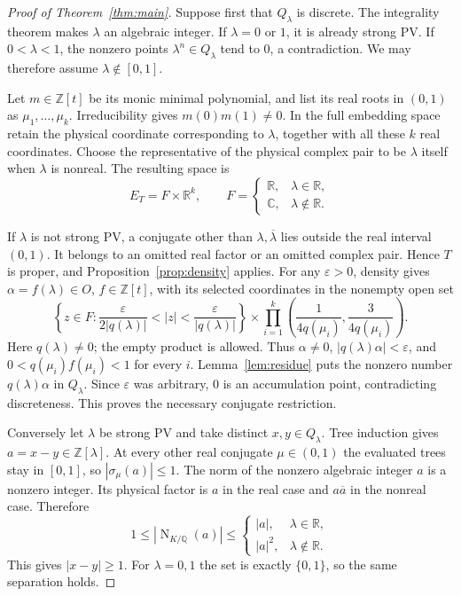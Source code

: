 \documentclass[11pt]{article}
\newcommand{\C}{\mathbb C}
\newcommand{\R}{\mathbb R}
\newcommand{\Z}{\mathbb Z}
\newcommand{\Q}{\mathbb Q}
\DeclareMathOperator{\Norm}{N}
\begin{document}
\begin{proof}[Proof of Theorem~\ref{thm:main}]
Suppose first that $Q_\lambda$ is discrete. The integrality theorem
\cite[Theorem 8.2]{fgh-extended} makes $\lambda$ an algebraic integer.
If $\lambda=0$ or $1$, it is already strong PV. If $0<\lambda<1$,
the nonzero points $\lambda^n\in Q_\lambda$ tend to $0$, a
contradiction. We may therefore assume $\lambda\notin[0,1]$.

Let $m\in\Z[t]$ be its monic minimal polynomial, and list its real
roots in $(0,1)$ as $\mu_1,\ldots,\mu_k$. Irreducibility gives
$m(0)m(1)\ne0$. In the full embedding space retain the physical
coordinate corresponding to $\lambda$, together with all these $k$
real coordinates. Choose the representative of the physical complex pair
to be $\lambda$ itself when $\lambda$ is nonreal. The resulting space is
\[
 E_T=F\times\R^k,\qquad
 F=\begin{cases}\R,&\lambda\in\R,\\\C,&\lambda\notin\R.\end{cases}
\]

If $\lambda$ is not strong PV, a conjugate other than
$\lambda,\overline\lambda$ lies outside the real interval $(0,1)$.
It belongs to an omitted real factor or an omitted complex pair. Hence
$T$ is proper, and Proposition~\ref{prop:density} applies.
For any $\varepsilon>0$, density gives $\alpha=f(\lambda)\in O$,
$f\in\Z[t]$, with its selected coordinates in the nonempty open set
\begin{equation}\label{eq:window}
 \left\{z\in F:\frac{\varepsilon}{2|q(\lambda)|}<|z|
                    <\frac{\varepsilon}{|q(\lambda)|}\right\}
 \times\prod_{i=1}^k
 \left(\frac1{4q(\mu_i)},\frac3{4q(\mu_i)}\right).
\end{equation}
Here $q(\lambda)\ne0$; the empty product is allowed.
Thus $\alpha\ne0$, $|q(\lambda)\alpha|<\varepsilon$, and
$0<q(\mu_i)f(\mu_i)<1$ for every $i$.
Lemma~\ref{lem:residue} puts the nonzero number
$q(\lambda)\alpha$ in $Q_\lambda$. Since $\varepsilon$ was arbitrary,
$0$ is an accumulation point, contradicting discreteness. This proves
the necessary conjugate restriction.

Conversely let $\lambda$ be strong PV and take distinct
$x,y\in Q_\lambda$. Tree induction gives $a=x-y\in\Z[\lambda]$.
At every other real conjugate $\mu\in(0,1)$ the evaluated trees
stay in $[0,1]$, so $|\sigma_\mu(a)|\le1$. The norm of the nonzero
algebraic integer $a$ is a nonzero integer. Its physical factor is
$a$ in the real case and $a\overline a$ in the nonreal case. Therefore
\[
 1\le|\Norm_{K/\Q}(a)|\le
 \begin{cases}|a|,&\lambda\in\R,\\|a|^2,&\lambda\notin\R.\end{cases}
\]
This gives $|x-y|\ge1$. For $\lambda=0,1$ the set is exactly
$\{0,1\}$, so the same separation holds.
\end{proof}
\end{document}
